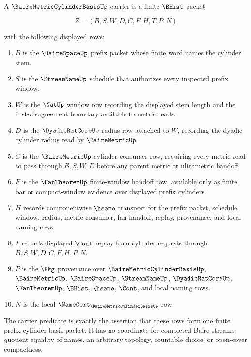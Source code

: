 \begin{definition}
\label{def:located-baire-metric-compactness-carrier}
A $\BaireMetricCylinderBasisUp$ carrier is a finite $\BHist$ packet

$$
Z=(B,S,W,D,C,F,H,T,P,N)
$$

with the following displayed rows:
\begin{enumerate}
\item $B$ is the $\BaireSpaceUp$ prefix packet whose finite word names the cylinder stem.
\item $S$ is the $\StreamNameUp$ schedule that authorizes every inspected prefix window.
\item $W$ is the $\NatUp$ window row recording the displayed stem length and the first-disagreement boundary available to metric reads.
\item $D$ is the $\DyadicRatCoreUp$ radius row attached to $W$, recording the dyadic cylinder radius read by $\BaireMetricUp$.
\item $C$ is the $\BaireMetricUp$ cylinder-consumer row, requiring every metric read to pass through $B,S,W,D$ before any parent metric or ultrametric handoff.
\item $F$ is the $\FanTheoremUp$ finite-window handoff row, available only as finite bar or compact-window evidence over displayed prefix cylinders.
\item $H$ records componentwise $\hsame$ transport for the prefix packet, schedule, window, radius, metric consumer, fan handoff, replay, provenance, and local naming rows.
\item $T$ records displayed $\Cont$ replay from cylinder requests through $B,S,W,D,C,F,H,P,N$.
\item $P$ is the $\Pkg$ provenance over $\BaireMetricCylinderBasisUp$, $\BaireMetricUp$, $\BaireSpaceUp$, $\StreamNameUp$, $\DyadicRatCoreUp$, $\FanTheoremUp$, $\BHist$, $\hsame$, $\Cont$, and local naming rows.
\item $N$ is the local $\NameCert_{\BaireMetricCylinderBasisUp}$ row.
\end{enumerate}
The carrier predicate is exactly the assertion that these rows form one finite prefix-cylinder basis packet. It has no coordinate for completed Baire streams, quotient equality of names, an arbitrary topology, countable choice, or open-cover compactness.
\end{definition}

